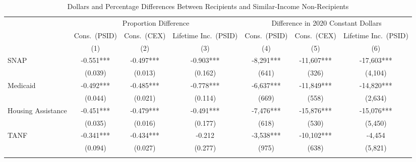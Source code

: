 \begin{table}[h!]
    \centering\small
    \caption{Dollars and Percentage Differences Between Recipients and Similar-Income Non-Recipients}
    \label{tab:levels_outcomes}
\begin{tabular*}{1.36\textwidth}{@{\extracolsep{\fill}}lcccccc}
    \toprule
                   & \multicolumn{3}{c}{Proportion Difference}                       & \multicolumn{3}{c}{Difference in  2020 Constant Dollars}\\ \cmidrule{2-4}\cmidrule{5-7}
                   & Cons.\ (PSID)      & Cons.\ (CEX)                 & Lifetime Inc.\  (PSID)                & Cons.\ (PSID)           & Cons.\ (CEX)                              & Lifetime Inc.\ (PSID)                                   \\
                   & (1)                          & (2)                              & (3)                                            & (4)                     & (5)                     & (6)                                                     \\ \midrule  \addlinespace
SNAP               & -0.551***   & -0.497***    & -0.903***     & -8,291***          & -11,607***                     & -17,603***                       \\
                   & (0.039)   & (0.013)    & (0.162)     & (641)         & (326)                        & (4,104)                       \\ \addlinespace
Medicaid           & -0.492*** & -0.485*** & -0.778*** & -6,637***     & -11,849***                   & -14,820***                   \\
                   & (0.044)  & (0.021) & (0.114) & (669)     & (558)                    & (2,634)                   \\  \addlinespace
Housing Assistance & -0.451***    & -0.479***       & -0.491***       & -7,476***        & -15,876***                        & -15,076***                         \\
                   & (0.035)    & (0.016)     & (0.177)       & (618)         & (530)                         & (5,450)                         \\  \addlinespace
TANF               & -0.341***    & -0.434***     & -0.212     & -3,538***      & -10,102***                    & -4,454                       \\
                   & (0.094)   & (0.027)    & (0.277)     & (975)          & (638)                 & (5,821)                       \\  \addlinespace

\end{tabular*}
\end{table}
